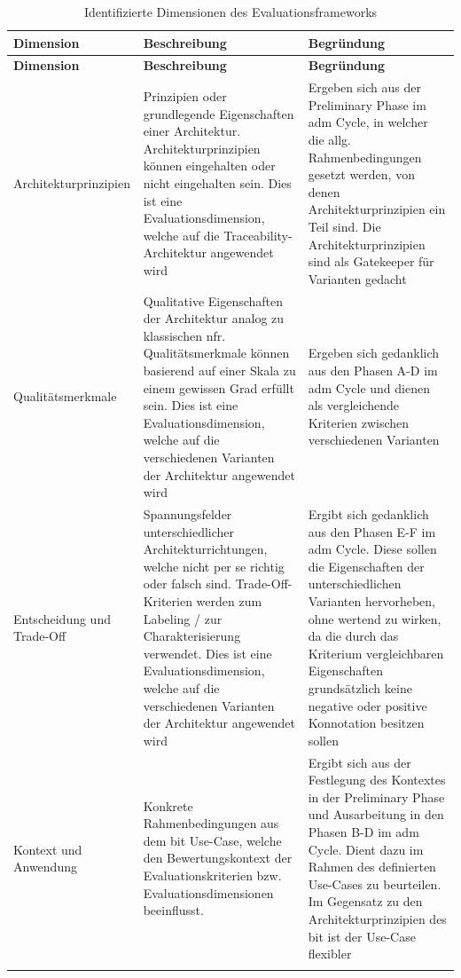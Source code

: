 \begin{longtable}{|
  L{3cm}|
  p{\dimexpr(\textwidth-3cm-6\arrayrulewidth)/2\relax}|
  p{\dimexpr(\textwidth-3cm-6\arrayrulewidth)/2\relax}|
}
    \hline
    \textbf{Dimension} & \textbf{Beschreibung} & \textbf{Begründung} \\
    \hline
    \endfirsthead

    \hline
    \textbf{Dimension} & \textbf{Beschreibung} & \textbf{Begründung} \\
    \hline
    \endhead

    Architekturprinzipien &
    Prinzipien oder grundlegende Eigenschaften einer Architektur. Architekturprinzipien können eingehalten oder nicht eingehalten sein. Dies ist eine Evaluationsdimension, welche auf die Traceability-Architektur angewendet wird &
    Ergeben sich aus der Preliminary Phase im \ac{adm} Cycle, in welcher die allg. Rahmenbedingungen gesetzt werden, von denen Architekturprinzipien ein Teil sind. Die Architekturprinzipien sind als Gatekeeper für Varianten gedacht
    \\
    \hline
    Qualitätsmerkmale &
    Qualitative Eigenschaften der Architektur analog zu klassischen \ac{nfr}. Qualitätsmerkmale können basierend auf einer Skala zu einem gewissen Grad erfüllt sein. Dies ist eine Evaluationsdimension, welche auf die verschiedenen Varianten der Architektur angewendet wird &
    Ergeben sich gedanklich aus den Phasen A-D im \ac{adm} Cycle und dienen als vergleichende Kriterien zwischen verschiedenen Varianten
    \\
    \hline
    Entscheidung und Trade-Off &
    Spannungsfelder unterschiedlicher Architekturrichtungen, welche nicht per se richtig oder falsch sind. Trade-Off-Kriterien werden zum Labeling / zur Charakterisierung verwendet. Dies ist eine Evaluationsdimension, welche auf die verschiedenen Varianten der Architektur angewendet wird &
    Ergibt sich gedanklich aus den Phasen E-F im \ac{adm} Cycle. Diese sollen die Eigenschaften der unterschiedlichen Varianten hervorheben, ohne wertend zu wirken, da die durch das Kriterium vergleichbaren Eigenschaften grundsätzlich keine negative oder positive Konnotation besitzen sollen
    \\
    \hline
    Kontext und Anwendung &
    Konkrete Rahmenbedingungen aus dem \ac{bit} Use-Case, welche den Bewertungskontext der Evaluationskriterien bzw. Evaluationsdimensionen beeinflusst. &
    Ergibt sich aus der Festlegung des Kontextes in der Preliminary Phase und Ausarbeitung in den Phasen B-D im \ac{adm} Cycle. Dient dazu im Rahmen des definierten Use-Cases zu beurteilen. Im Gegensatz zu den Architekturprinzipien des \ac{bit} ist der Use-Case flexibler
    \\
    \hline
    \caption{Identifizierte Dimensionen des Evaluationsframeworks}
    \label{tab:evaluation-dimensions}
\end{longtable}

